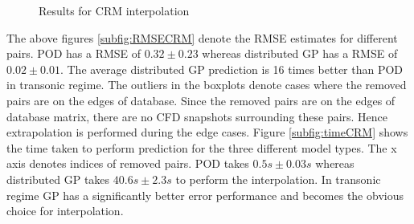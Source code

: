 \begin{figure}[!ht]
  \centering
  \quad
  \caption{Results for CRM interpolation}
\end{figure}

The above figures \ref{subfig:RMSECRM} denote the RMSE estimates for different pairs. POD has a RMSE of $0.32\pm0.23$ whereas distributed GP has a RMSE of $0.02\pm0.01$. The average distributed GP prediction is 16 times better than POD in transonic regime. The outliers in the boxplots denote cases where the removed pairs are on the edges of database. Since the removed pairs are on the edges of database matrix, there are no CFD snapshots surrounding these pairs. Hence extrapolation is performed during the edge cases. Figure \ref{subfig:timeCRM} shows the time taken to perform prediction for the three different model types. The x axis denotes indices of removed pairs. POD takes $0.5s\pm0.03s$ whereas distributed GP takes $40.6s\pm2.3s$ to perform the interpolation. In transonic regime GP has a significantly better error performance and becomes the obvious choice for interpolation.

